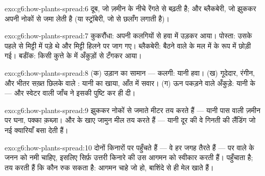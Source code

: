 \begin{solution}{exo:g6:how-plants-spread:6}
दूब, जो ज़मीन के नीचे रेंगते  से बढ़ती है; और ब्लैकबेरी, जो झुककर
अपनी नोकों से  जमा लेती है (या स्ट्रॉबेरी, जो  से छलाँग
लगाती है)।
\end{solution}

\begin{solution}{exo:g6:how-plants-spread:7}
कुकरौंधा: अपनी कलगियों से हवा में उड़कर आया। पोस्ता: उसके  पहले से
मिट्टी में पड़े थे और मिट्टी हिलने पर जाग गए। ब्लैकबेरी: बैठने वाले
 के मल में  के रूप में छोड़ी गई। बर्डॉक: किसी कुत्ते के
 में अँकुड़ों से टँगकर आया।
\end{solution}

\begin{solution}{exo:g6:how-plants-spread:8}
(क) उड़ान का सामान --- कलगी: यानी हवा। (ख) गूदेदार, रंगीन, और भीतर
सख़्त छिलके वाले : यानी  का खाया,  आँत में सवार। (ग) ऊन
पकड़ने वाले अँकुड़े: यानी  के  --- और स्वेटर वाली जाँच ने इसकी
पुष्टि कर ही दी।
\end{solution}

\begin{solution}{exo:g6:how-plants-spread:9}
झुककर नोकों से  जमाते  मीटर तय करते हैं --- यानी पास वाली ज़मीन
पर घना, पक्का क़ब्ज़ा। और  के खाए जामुन मील तय करते हैं ---
यानी दूर की वे गिनती की लैंडिंग जो नई क्यारियाँ बसा देती हैं।
\end{solution}

\begin{solution}{exo:g6:how-plants-spread:10}
 दोनों किनारों पर पहुँचते हैं --- वे हर जगह तैरते हैं --- पर
 वाले  के जनन को नमी चाहिए, इसलिए सिर्फ़ उत्तरी किनारे की
 उस आगमन को स्वीकार करती हैं।  पहुँचाता है;
 तय करती हैं कि कौन रुक सकता है: आगमन चाहे जो हो, बाशिंदे
 से ही मेल खाते हैं।
\end{solution}

